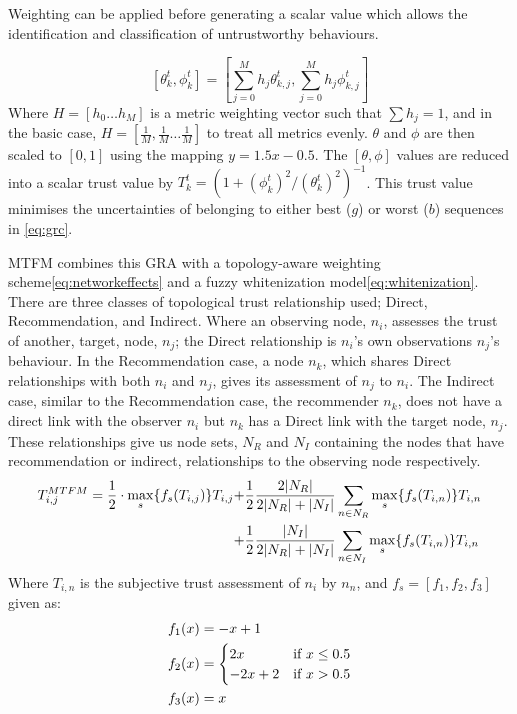 Weighting can be applied before generating a scalar value which allows the identification and classification of untrustworthy behaviours.

%
\begin{equation}
  \label{eq:metric_weighting}
  [\theta_k^t, \phi_k^t] = \left[\sum_{j=0}^M h_j \theta_{k,j}^t,\sum_{j=0}^M h_j \phi_{k,j}^t \right]
\end{equation}
Where $H=[h_0\dots h_M]$ is a metric weighting vector such that $\sum h_j = 1$, and in the basic case, $H=[\frac{1}{M},\frac{1}{M}\dots\frac{1}{M}]$ to treat all metrics evenly.
$\theta$ and $\phi$ are then scaled to $[0,1]$ using the mapping $y = 1.5 x - 0.5$.
The $[\theta,\phi]$ values are reduced into a scalar trust value by $T_k^t = ({1+{(\phi_k^t)^2}/{(\theta_k^t)^2}})^{-1}$.
This trust value minimises the uncertainties of belonging to either best ($g$) or worst ($b$) sequences in \eqref{eq:grc}.

MTFM combines this GRA with a topology-aware weighting scheme\eqref{eq:networkeffects} and a fuzzy whitenization model\eqref{eq:whitenization}. There are three classes of topological trust relationship used; Direct, Recommendation, and Indirect.
Where an observing node, $n_i$, assesses the trust of another, target, node, $n_j$; the Direct relationship is $n_i$'s own observations $n_j$'s behaviour.
In the Recommendation case, a node $n_k$, which shares Direct relationships with both $n_i$ and $n_j$, gives its assessment of $n_j$ to $n_i$.
The Indirect case, similar to the Recommendation case, the recommender $n_k$, does not have a direct link with the observer $n_i$ but $n_k$ has a Direct link with the target node, $n_j$.
These relationships give us node sets, $N_R$ and $N_I$ containing the nodes that have recommendation or indirect, relationships to the observing node respectively.
%
\begin{align}
  \label{eq:networkeffects}
  T_{i,j}^{MTFM}=\frac{1}{2} \cdot \max_s\{f_s(T_{i,j})\} T_{i,j}+&\frac{1}{2} \frac{2|N_R| }{2|N_R| + |N_I|}\sum_{n \in N_R} \max_s\{f_s(T_{i,n})\} T_{i,n}\\ \notag
  +&\frac{1}{2} \frac{|N_I| }{2|N_R| + |N_I|}\sum_{n \in N_I} \max_s\{f_s(T_{i,n})\} T_{i,n} 
\end{align}
 Where $T_{i,n}$ is the subjective trust assessment of $n_i$ by $n_n$, and $f_s = [ f_1,f_2, f_3]$ given as:
\begin{align}
  \label{eq:whitenization}
  f_1(x)&= -x+1\notag\\
  f_2(x)&= 
  \begin{cases}
    2x & \text{if }x\leq 0.5\\
    -2x+2 & \text{if }x>0.5
  \end{cases}\\
  f_3(x)&= x\notag
\end{align}


